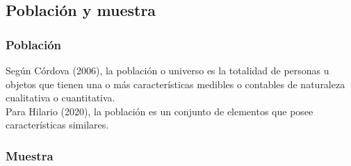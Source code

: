 \subsection{Población y muestra}
 
	\subsubsection{Población}
	Según Córdova (2006), la población o universo es la totalidad de personas u objetos que tienen una o más características medibles o contables de naturaleza cualitativa o cuantitativa.\\
Para Hilario (2020), la población es un conjunto de elementos que posee características similares.


	\subsubsection{Muestra}
	
